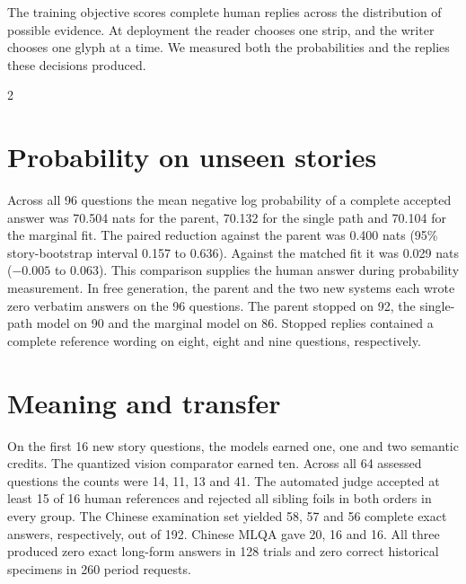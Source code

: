 \newpage
{}
\noindent The training objective scores complete human replies across the distribution of possible evidence. At deployment the reader chooses one strip, and the writer chooses one glyph at a time. We measured both the probabilities and the replies these decisions produced.
\begin{multicols}{2}
\section*{Probability on unseen stories}
Across all 96 questions the mean negative log probability of a complete accepted answer was 70.504 nats for the parent, 70.132 for the single path and 70.104 for the marginal fit. The paired reduction against the parent was 0.400 nats (95\% story-bootstrap interval 0.157 to 0.636). Against the matched fit it was 0.029 nats ($-0.005$ to 0.063). This comparison supplies the human answer during probability measurement. In free generation, the parent and the two new systems each wrote zero verbatim answers on the 96 questions. The parent stopped on 92, the single-path model on 90 and the marginal model on 86. Stopped replies contained a complete reference wording on eight, eight and nine questions, respectively.
\section*{Meaning and transfer}
On the first 16 new story questions, the models earned one, one and two semantic credits. The quantized vision comparator earned ten. Across all 64 assessed questions the counts were 14, 11, 13 and 41. The automated judge accepted at least 15 of 16 human references and rejected all sibling foils in both orders in every group. The Chinese examination set yielded 58, 57 and 56 complete exact answers, respectively, out of 192. Chinese MLQA gave 20, 16 and 16. All three produced zero exact long-form answers in 128 trials and zero correct historical specimens in 260 period requests.

\end{multicols}
